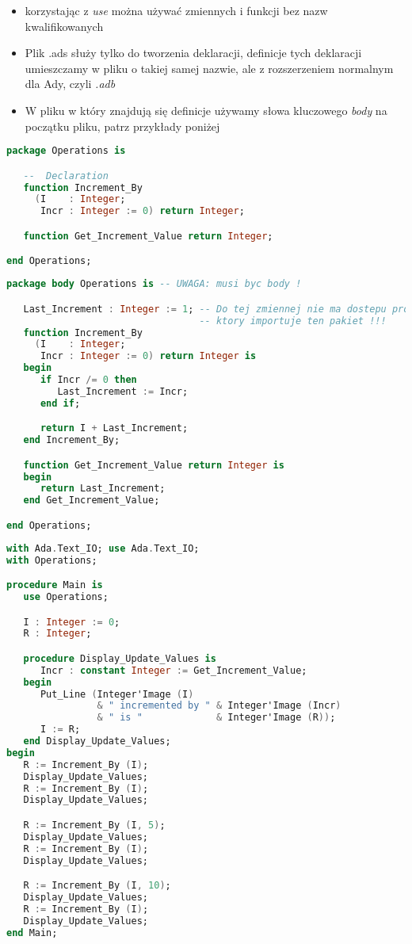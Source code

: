 \documentclass[a4paper,15pt]{article}
\begin{document}
\begin{itemize}
\item korzystając z \textit{use} można używać zmiennych i funkcji bez nazw kwalifikowanych
\item Plik .ads służy tylko do tworzenia deklaracji, definicje tych deklaracji umieszczamy w pliku o takiej samej nazwie, ale z rozszerzeniem normalnym dla Ady, czyli \textit{.adb}
\item W pliku w który znajdują się definicje używamy słowa kluczowego \textit{body} na początku pliku, patrz przykłady poniżej
\end{itemize}

\begin{lstlisting}[language=Ada, caption=operations.ads]
package Operations is

   --  Declaration
   function Increment_By
     (I    : Integer;
      Incr : Integer := 0) return Integer;

   function Get_Increment_Value return Integer;

end Operations;
\end{lstlisting}

\begin{lstlisting}[language=Ada, caption=operations.adb]
package body Operations is -- UWAGA: musi byc body !

   Last_Increment : Integer := 1; -- Do tej zmiennej nie ma dostepu program
								  -- ktory importuje ten pakiet !!!
   function Increment_By
     (I    : Integer;
      Incr : Integer := 0) return Integer is
   begin
      if Incr /= 0 then
         Last_Increment := Incr;
      end if;

      return I + Last_Increment;
   end Increment_By;

   function Get_Increment_Value return Integer is
   begin
      return Last_Increment;
   end Get_Increment_Value;

end Operations;
\end{lstlisting}

\begin{lstlisting}[language=Ada, caption=Uzycie pakietu operations]
with Ada.Text_IO; use Ada.Text_IO;
with Operations;

procedure Main is
   use Operations;

   I : Integer := 0;
   R : Integer;

   procedure Display_Update_Values is
      Incr : constant Integer := Get_Increment_Value;
   begin
      Put_Line (Integer'Image (I)
                & " incremented by " & Integer'Image (Incr)
                & " is "             & Integer'Image (R));
      I := R;
   end Display_Update_Values;
begin
   R := Increment_By (I);
   Display_Update_Values;
   R := Increment_By (I);
   Display_Update_Values;

   R := Increment_By (I, 5);
   Display_Update_Values;
   R := Increment_By (I);
   Display_Update_Values;

   R := Increment_By (I, 10);
   Display_Update_Values;
   R := Increment_By (I);
   Display_Update_Values;
end Main;
\end{lstlisting}
\end{document}
